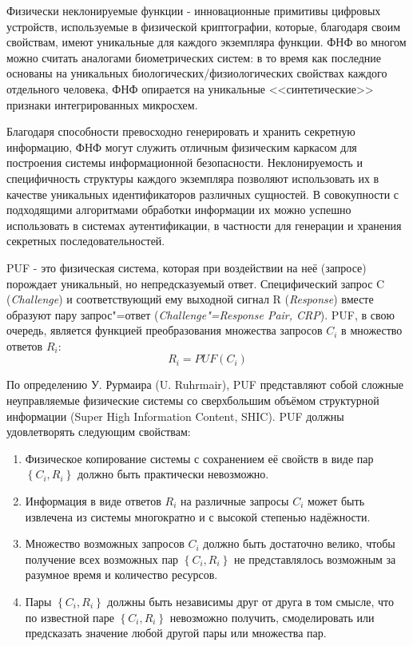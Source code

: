 Физически неклонируемые функции - инновационные примитивы цифровых устройств, используемые в физической криптографии, которые, благодаря своим свойствам, имеют уникальные для каждого экземпляра функции. ФНФ во многом можно считать аналогами биометрических систем: в то время как последние основаны на уникальных биологических/физиологических свойствах каждого отдельного человека, ФНФ опирается на уникальные <<синтетические>> признаки интегрированных микросхем.

Благодаря способности превосходно генерировать и хранить секретную информацию, ФНФ могут служить отличным физическим каркасом для построения системы информационной безопасности. Неклонируемость и специфичность структуры каждого экземпляра позволяют использовать их в качестве уникальных идентификаторов различных сущностей. В совокупности с подходящими алгоритмами обработки информации их можно успешно использовать в системах аутентификации, в частности для генерации и хранения секретных последовательностей.


\def\crp {\left\{C_i, R_i\right\}}

PUF - это физическая система, которая при воздействии на неё (запросе) порождает уникальный, но непредсказуемый ответ. Специфический запрос C (\emph{Challenge}) и соответствующий ему выходной сигнал R (\emph{Response}) вместе образуют пару запрос"=ответ (\emph{Challenge"={}Response Pair, CRP}). PUF, в свою очередь, является функцией преобразования множества запросов $ C_i $ в множество ответов $ R_i $:
\begin{equation}
  \label{eq:domain:pufs:puf_main}
  R_i = PUF(C_i)
\end{equation}

По определению У. Рурмаира (U. Ruhrmair), PUF представляют собой сложные неуправляемые физические системы со сверхбольшим объёмом структурной информации (Super High Information Content, SHIC). PUF должны удовлетворять следующим свойствам:
\begin{enumerate}
  \item Физическое копирование системы с сохранением её свойств в виде пар $ \crp $ должно быть практически невозможно.
  \item Информация в виде ответов $ R_i $ на различные запросы $ C_i $ может быть извлечена из системы многократно и с высокой степенью надёжности.
  \item Множество возможных запросов $ C_i $ должно быть достаточно велико, чтобы получение всех возможных пар $ \crp $ не представлялось возможным за разумное время и количество ресурсов.
  \item Пары $ \crp $ должны быть независимы друг от друга в том смысле, что по известной паре $ \crp $ невозможно получить, смоделировать или предсказать значение любой другой пары или множества пар.
\end{enumerate}

